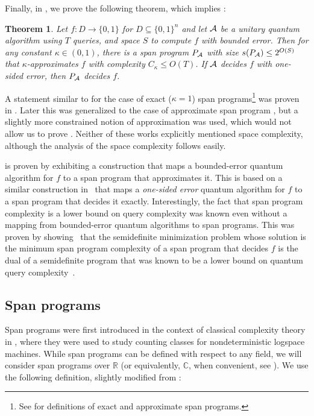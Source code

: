\documentclass[11pt]{article}
\numberwithin{equation}{section}
\newtheorem{theorem}{Theorem}[section]
\theoremstyle{definition}
\theoremstyle{plain}
\newcommand{\C}{\mathbb C}
\newcommand{\R}{\mathbb R}
\begin{document}
Finally, in , we prove the following theorem, which implies :
\begin{theorem}\label{thm:alg-to-span}
Let $f:D\rightarrow \{0,1\}$ for $D\subseteq \{0,1\}^n$ and let ${\cal A}$ be a unitary quantum algorithm using $T$ queries, and space $S$ to compute $f$ with bounded error. Then for any constant $\kappa\in (0,1)$, there is a span program $P_{\cal A}$ with size $s(P_{\cal A})\leq 2^{O(S)}$ that $\kappa$-approximates $f$ with complexity $C_{\kappa}\leq O(T)$. If $\cal A$ decides $f$ with one-sided error, then $P_{\cal A}$ decides $f$. 
\end{theorem}


%
A statement similar   %
to  for the case of exact ($\kappa=1$) span programs\footnote{See  for definitions of exact and approximate span programs.} was proven in \cite{Rei09}. Later this was generalized to the case of approximate span program \cite{IJ15}, but a slightly more constrained notion of approximation was used, which would not allow us to prove . Neither of these works explicitly mentioned space complexity, although the analysis of the space complexity follows easily. 

 is proven by exhibiting a construction that maps a bounded-error quantum algorithm for $f$ to a span program that approximates it. This is based on a similar construction in~\cite{Rei09} that maps a \emph{one-sided error} quantum algorithm for $f$ to a span program that decides it exactly. Interestingly, the fact that span program complexity is a lower bound on query complexity was known even without a mapping from bounded-error quantum algorithms to span programs. This was proven by showing~\cite{Rei09} that the semidefinite minimization problem whose solution is the minimum span program complexity of a span program that decides $f$ is the dual of a semidefinite program that was known to be a lower bound on quantum query complexity~\cite{amb00,BSS03,HLS07}.   





\subsection{Span programs}\label{sec:span}

Span programs were first introduced in the context of classical complexity theory in \cite{KW93}, where they were used to study counting classes for nondeterministic logspace machines. While span programs can be defined with respect to any field, we will consider span programs over $\R$ (or equivalently, $\C$, when convenient, see ).
We use the following definition, slightly modified from \cite{KW93}:
\end{document}
